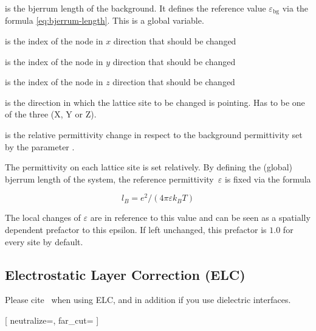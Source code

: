 \begin{arguments}
\item[\var{l_B}] is the bjerrum length of the background. It defines
	the reference value $\varepsilon_\text{bg}$ via the formula 
	\eqref{eq:bjerrum-length}. This is a global variable.
\item[\var{node\_x}] is the index of the node in $x$ direction that
	should be changed
\item[\var{node\_y}] is the index of the node in $y$ direction that
	should be changed
\item[\var{node\_z}] is the index of the node in $z$ direction that
	should be changed
\item[\var{X/Y/Z}] is the direction in which the lattice site to be
	changed is pointing. Has to be one of the three (X, Y or Z).
\item[\var{\varepsilon}] is the relative permittivity change in
	respect to the background permittivity set by the parameter
	.
\end{arguments}

The permittivity on each lattice site is set relatively. By defining
the (global) bjerrum length of the system, the reference
permittivity~$\varepsilon$ is fixed via the formula

\begin{equation}
l_B = e^2 / (4 \pi \varepsilon k_B T)
\label{eq:bjerrum-length}
\end{equation}

The local changes of $\varepsilon$ are in reference to this value
and can be seen as a spatially dependent prefactor to this epsilon.
If left unchanged, this prefactor is $1.0$ for every site by
default.

\subsection{Electrostatic Layer Correction (ELC)}

\begin{citebox}
  Please cite~ when using ELC, and in addition
   if you use dielectric interfaces.
\end{citebox}

\begin{pysyntax}
  [
    neutralize=,
    far_cut=
  ]
\end{pysyntax}


